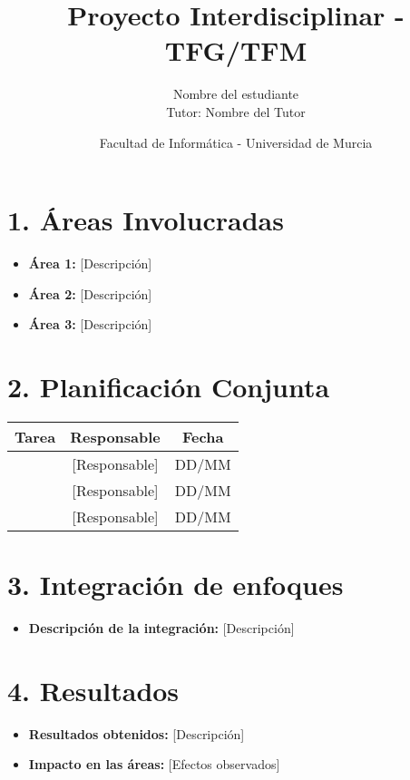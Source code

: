 \documentclass[12pt, a4paper]{article}
\title{\textbf{Proyecto Interdisciplinar - TFG/TFM}}
\author{Nombre del estudiante \\ Tutor: Nombre del Tutor}
\date{Facultad de Informática - Universidad de Murcia}
\begin{document}
\maketitle

\section*{1. Áreas Involucradas}
\begin{itemize}
    \item \textbf{Área 1:} [Descripción]
    \item \textbf{Área 2:} [Descripción]
    \item \textbf{Área 3:} [Descripción]
\end{itemize}

\section*{2. Planificación Conjunta}
\begin{tabular}{|c|c|c|}
    \hline
    \textbf{Tarea} & \textbf{Responsable} & \textbf{Fecha} \\ \hline
    [Tarea 1] & [Responsable] & DD/MM \\ \hline
    [Tarea 2] & [Responsable] & DD/MM \\ \hline
    [Tarea 3] & [Responsable] & DD/MM \\ \hline
\end{tabular}

\section*{3. Integración de enfoques}
\begin{itemize}
    \item \textbf{Descripción de la integración:} [Descripción]
\end{itemize}

\section*{4. Resultados}
\begin{itemize}
    \item \textbf{Resultados obtenidos:} [Descripción]
    \item \textbf{Impacto en las áreas:} [Efectos observados]
\end{itemize}
\end{document}
